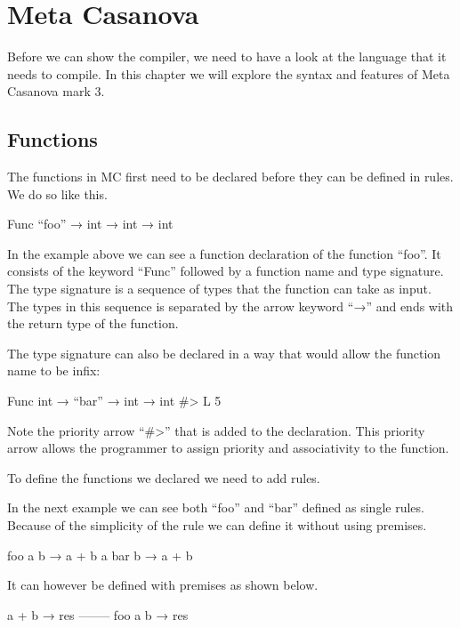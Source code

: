 \section{Meta Casanova}

Before we can show the compiler, we need to have a look at the language that it needs to compile. 
In this chapter we will explore the syntax and features of Meta Casanova mark 3. 

\subsection{Functions}

The functions in MC first need to be declared before they can be defined in rules. We do so like this.

\begin{code}
	Func “foo” → int → int → int
\end{code}

In the example above we can see a function declaration of the function “foo”. 
It consists of the keyword “Func” followed by a function name and type signature. 
The type signature is a sequence of types that the function can take as input. 
The types in this sequence is separated by the arrow keyword “→” and ends with the return type of the function. 

The type signature can also be declared in a way that would allow the function name to be infix:

\begin{code}
	Func int → “bar” → int → int  #> L 5
\end{code}

Note the priority arrow “#>” that is added to the declaration. 
This priority arrow allows the programmer to assign priority and associativity to the function. 

To define the functions we declared we need to add rules.

In the next example we can see both “foo” and “bar” defined as single rules. 
Because of the simplicity of the rule we can define it without using premises.

\begin{code}
	foo a b → a + b
	a bar b → a + b
\end{code}

It can however be defined with premises as shown below.

\begin{code}
	a + b → res 
	--------
	foo a b → res
\end{code}

